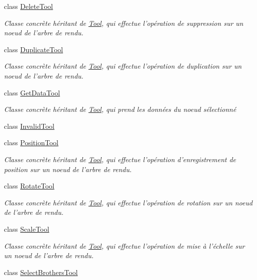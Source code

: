 \begin{DoxyCompactItemize}
class \hyperlink{class_delete_tool}{Delete\-Tool}
\begin{DoxyCompactList}\small\item\em Classe concrète héritant de \hyperlink{class_tool}{Tool}, qui effectue l'opération de suppression sur un noeud de l'arbre de rendu. \end{DoxyCompactList}\item 
class \hyperlink{class_duplicate_tool}{Duplicate\-Tool}
\begin{DoxyCompactList}\small\item\em Classe concrète héritant de \hyperlink{class_tool}{Tool}, qui effectue l'opération de duplication sur un noeud de l'arbre de rendu. \end{DoxyCompactList}\item 
class \hyperlink{class_get_data_tool}{Get\-Data\-Tool}
\begin{DoxyCompactList}\small\item\em Classe concrète héritant de \hyperlink{class_tool}{Tool}, qui prend les données du noeud sélectionné \end{DoxyCompactList}\item 
class \hyperlink{class_invalid_tool}{Invalid\-Tool}
\item 
class \hyperlink{class_position_tool}{Position\-Tool}
\begin{DoxyCompactList}\small\item\em Classe concrète héritant de \hyperlink{class_tool}{Tool}, qui effectue l'opération d'enregistrement de position sur un noeud de l'arbre de rendu. \end{DoxyCompactList}\item 
class \hyperlink{class_rotate_tool}{Rotate\-Tool}
\begin{DoxyCompactList}\small\item\em Classe concrète héritant de \hyperlink{class_tool}{Tool}, qui effectue l'opération de rotation sur un noeud de l'arbre de rendu. \end{DoxyCompactList}\item 
class \hyperlink{class_scale_tool}{Scale\-Tool}
\begin{DoxyCompactList}\small\item\em Classe concrète héritant de \hyperlink{class_tool}{Tool}, qui effectue l'opération de mise à l'échelle sur un noeud de l'arbre de rendu. \end{DoxyCompactList}\item 
class \hyperlink{class_select_brothers_tool}{Select\-Brothers\-Tool}

\end{DoxyCompactItemize}
